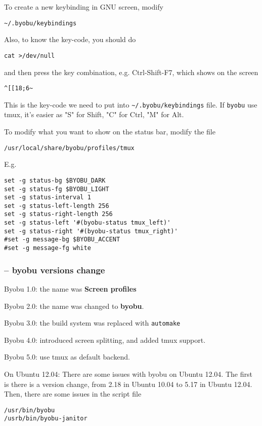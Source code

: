To create a new keybinding in GNU screen, modify
\begin{verbatim}
~/.byobu/keybindings
\end{verbatim}
Also, to know the key-code, you should do
\begin{verbatim}
cat >/dev/null
\end{verbatim}
and then press the key combination, e.g. Ctrl-Shift-F7, which shows on the
screen 
\begin{verbatim}
^[[18;6~
\end{verbatim}
This is the key-code we need to put into \verb!~/.byobu/keybindings! file. If
\verb!byobu! use tmux, it's easier as "S" for Shift, "C" for Ctrl, "M" for Alt.



To modify what you want to show on the status bar, modify the file
\begin{verbatim}
/usr/local/share/byobu/profiles/tmux
\end{verbatim}
E.g.
\begin{verbatim}
set -g status-bg $BYOBU_DARK
set -g status-fg $BYOBU_LIGHT
set -g status-interval 1
set -g status-left-length 256
set -g status-right-length 256
set -g status-left '#(byobu-status tmux_left)'
set -g status-right '#(byobu-status tmux_right)'
#set -g message-bg $BYOBU_ACCENT
#set -g message-fg white
\end{verbatim}

\subsubsection{-- byobu versions change}	
\label{sec:byobu-versions}

Byobu 1.0: the name was {\bf Screen profiles}

Byobu 2.0: the name was changed to {\bf byobu}.

Byobu 3.0: the build system was replaced with \verb!automake!

Byobu 4.0: introduced screen splitting, and added tmux support.

Byobu 5.0: use tmux as default backend.

On Ubuntu 12.04: There are some issues with byobu on Ubuntu 12.04. The first is there is a
version change, from 2.18 in Ubuntu 10.04 to 5.17 in Ubuntu 12.04. 
Then, there are some issues in the script file
\begin{verbatim}
/usr/bin/byobu
/usrb/bin/byobu-janitor
\end{verbatim}

